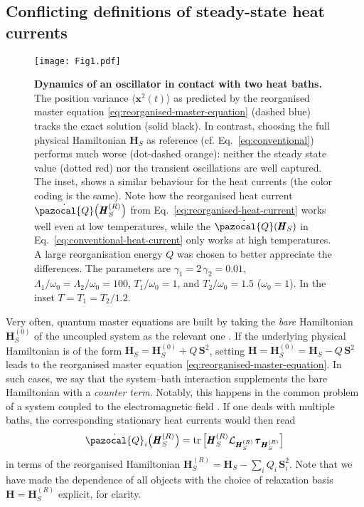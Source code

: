 \documentclass[aps,pra,superscriptaddress,twocolumn,nofootinbib]{revtex4-2}
\DeclareMathOperator{\tr}{tr}
\begin{document}
\subsection{Conflicting definitions of steady-state heat currents}\label{sec:conflicting-definitions-heat-currents}

\begin{figure}[t]
\centering
\texttt{[image: Fig1.pdf]}
\caption{\textbf{Dynamics of an oscillator in contact with two heat baths.} The position variance $\textstyle{\langle \pmb{x}^2(t) \rangle}$ as predicted by the reorganised master equation \eqref{eq:reorganised-master-equation} (dashed blue) tracks the exact solution (solid black). In contrast, choosing the full physical Hamiltonian $\pmb{H}_S$ as reference (cf. Eq.~\eqref{eq:conventional}) performs much worse (dot-dashed orange): neither the steady state value (dotted red) nor the transient oscillations are well captured. The inset, shows a similar behaviour for the heat currents (the color coding is the same). Note how the reorganised heat current $\dot{\pazocal{Q}}\big(\pmb{H}_S^{(R)}\big)$ from Eq.~\eqref{eq:reorganised-heat-current} works well even at low temperatures, while the $\dot{\pazocal{Q}}(\pmb{H}_S)$ in Eq.~\eqref{eq:conventional-heat-current} only works at high temperatures. A large reorganisation energy $ Q $ was chosen to better appreciate the differences. The parameters are $\gamma_1 = 2\,\gamma_2 = 0.01$, $\Lambda_1/\omega_0 = \Lambda_2/\omega_0 = 100$, $T_1/\omega_0 = 1$, and $T_2/\omega_0 = 1.5$ ($\omega_0 = 1$). In the inset $ T = T_1 = T_2/1.2$.}
\label{fig1}
\centering
\end{figure}

Very often, quantum master equations are built by taking the \textit{bare} Hamiltonian $\pmb{H}_S^{(0)}$ of the uncoupled system as the relevant one \cite{winczewski2021,correa2023}. If the underlying physical Hamiltonian is of the form $ \pmb{H}_S = \pmb{H}_S^{(0)} + Q\,\pmb{S}^2 $, setting $ \pmb{H} = \pmb{H}_S^{(0)} = \pmb{H}_S - Q\,\pmb{S}^2$ leads to the reorganised master equation \eqref{eq:reorganised-master-equation}. In such cases, we say that the system--bath interaction supplements the bare Hamiltonian with a \textit{counter term}. Notably, this happens in the common problem of a system coupled to the electromagnetic field \cite{caldeira1983tunnelling}. If one deals with multiple baths, the corresponding stationary heat currents would then read
\begin{equation}\label{eq:reorganised-heat-current}
    \dot{\pazocal{Q}}_i\big(\pmb{H}_S^{(R)}\big) = \tr{\big[ \pmb{H}_S^{(R)}\mathcal{L}_{\pmb{H}_S^{(R)}}\,\pmb{\tau}_{\pmb{H}_S^{(R)}}\big]}
\end{equation}
in terms of the reorganised Hamiltonian $ \pmb{H}_S^{(R)} = \pmb{H}_S - \sum\nolimits_i Q_i\,\pmb{S}_i^2 $. Note that we have made the dependence of all objects with the choice of relaxation basis $ \pmb{H} = \pmb{H}_S^{(R)} $ explicit, for clarity.
\end{document}
